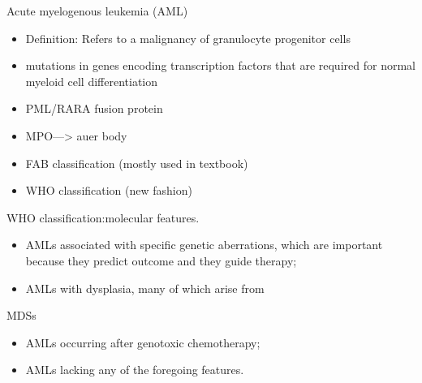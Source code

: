 \documentclass[
  ignorenonframetext,
]{beamer}
\begin{document}
\begin{frame}
\begin{block}{Acute myelogenous leukemia (AML)}
\protect\hypertarget{acute-myelogenous-leukemia-aml}{}
\begin{itemize}
\item
  Definition: Refers to a malignancy of granulocyte progenitor cells
\item
  mutations in genes encoding transcription factors that are required
  for normal myeloid cell differentiation
\item
  PML/RARA fusion protein
\item
  MPO---\textgreater{} auer body
\end{itemize}
\end{block}
\end{frame}

\begin{frame}
\begin{itemize}
\item
  FAB classification (mostly used in textbook)
\item
  WHO classification (new fashion)
\end{itemize}
\end{frame}

\begin{frame}
\begin{block}{WHO classification:molecular features.}
\protect\hypertarget{who-classificationmolecular-features.}{}
\begin{itemize}
\item
  AMLs associated with specific genetic aberrations, which are important
  because they predict outcome and they guide therapy;
\item
  AMLs with dysplasia, many of which arise from
\end{itemize}

MDSs

\begin{itemize}
\item
  AMLs occurring after genotoxic chemotherapy;
\item
  AMLs lacking any of the foregoing features.
\end{itemize}
\end{block}
\end{frame}
\end{document}
